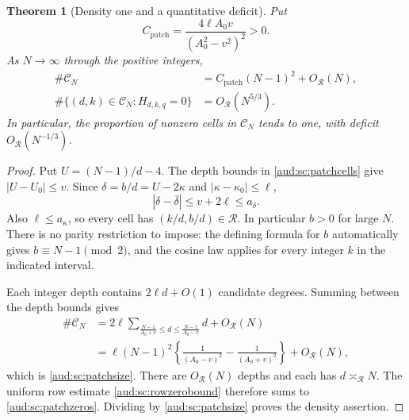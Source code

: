 \documentclass[11pt,a4paper]{article}
\numberwithin{equation}{section}
\newtheorem{theorem}{Theorem}[section]
\begin{document}
\begin{theorem}[Density one and a quantitative deficit]\label{aud:sc:patchdensity}
Put
\begin{equation}\label{aud:sc:patchconstant}
 C_{\mathrm{patch}}=
 \frac{4\ell A_0v}{(A_0^2-v^2)^2}>0.
\end{equation}
As $N\to\infty$ through the positive integers,
\begin{align}
 \#\mathcal C_N
 &=C_{\mathrm{patch}}(N-1)^2+O_{\mathcal R}(N),
       \label{aud:sc:patchsize}\\
 \#\{(d,k)\in\mathcal C_N:H_{d,k,q}=0\}
 &=O_{\mathcal R}(N^{5/3}).\label{aud:sc:patchzeros}
\end{align}
In particular, the proportion of nonzero cells in $\mathcal C_N$ tends to
one, with deficit $O_{\mathcal R}(N^{-1/3})$.
\end{theorem}
\begin{proof}
Put $U=(N-1)/d-4$.  The depth bounds in \eqref{aud:sc:patchcells} give
$|U-U_0|\le v$.  Since $\delta=b/d=U-2\kappa$ and
$|\kappa-\kappa_0|\le\ell$,
\[
 |\delta-\bar\delta|\le v+2\ell\le a_\delta.
\]
Also $\ell\le a_\kappa$, so every cell has
$(k/d,b/d)\in\mathcal R$.  In particular $b>0$ for large $N$.
There is no parity restriction to impose: the defining formula for $b$
automatically gives $b\equiv N-1\pmod2$, and the cosine law applies for
every integer $k$ in the indicated interval.

Each integer depth contains $2\ell d+O(1)$ candidate degrees.  Summing
between the depth bounds gives
\begin{align*}
 \#\mathcal C_N
 &=2\ell\sum_{\frac{N-1}{A_0+v}\le d\le\frac{N-1}{A_0-v}}d
       +O_{\mathcal R}(N)\\
 &=\ell(N-1)^2
    \left\{\frac1{(A_0-v)^2}-\frac1{(A_0+v)^2}\right\}
       +O_{\mathcal R}(N),
\end{align*}
which is \eqref{aud:sc:patchsize}.  There are $O_{\mathcal R}(N)$ depths and each
has $d\asymp_{\mathcal R}N$.  The uniform row estimate
\eqref{aud:sc:rowzerobound} therefore sums to \eqref{aud:sc:patchzeros}.  Dividing
by \eqref{aud:sc:patchsize} proves the density assertion.
\end{proof}
\end{document}
